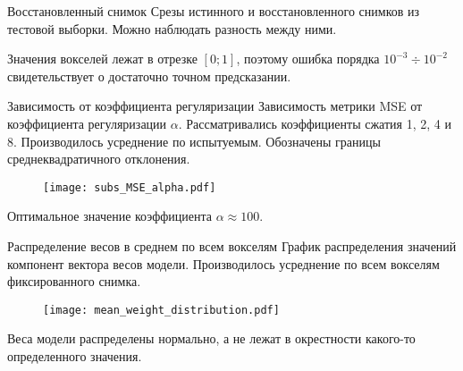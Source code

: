 \documentclass{beamer}
\begin{document}
\begin{frame}{Восстановленный снимок}
    Срезы истинного и восстановленного снимков из тестовой выборки.
    Можно наблюдать разность между ними.
    \begin{figure}[h!]
		\centering
		\hfill
		\hfill
		\label{fig:4}
	\end{figure}
    Значения вокселей лежат в отрезке $[0; 1]$, поэтому ошибка порядка $10^{-3} \div 10^{-2}$
    свидетельствует о достаточно точном предсказании.
\end{frame}
\begin{frame}{Зависимость от коэффициента регуляризации}
    Зависимость метрики MSE от коэффициента регуляризации $\alpha$.
    Рассматривались коэффициенты сжатия 1, 2, 4 и 8.
    Производилось усреднение по испытуемым.
	Обозначены границы среднеквадратичного отклонения.
    \begin{figure}[h!]
		\centering
		\texttt{[image: subs\_MSE\_alpha.pdf]}
		\label{fig:5}
	\end{figure}
    Оптимальное значение коэффициента $\alpha \approx 100$.
\end{frame}
\begin{frame}{Распределение весов в среднем по всем вокселям}
    График распределения значений компонент вектора весов модели.
    Производилось усреднение по всем вокселям фиксированного снимка.
    \begin{figure}[h!]
		\centering
		\texttt{[image: mean\_weight\_distribution.pdf]}
		\label{fig:6}
	\end{figure}
    Веса модели распределены нормально, а не лежат в окрестности какого-то определенного
    значения.
\end{frame}
\end{document}
